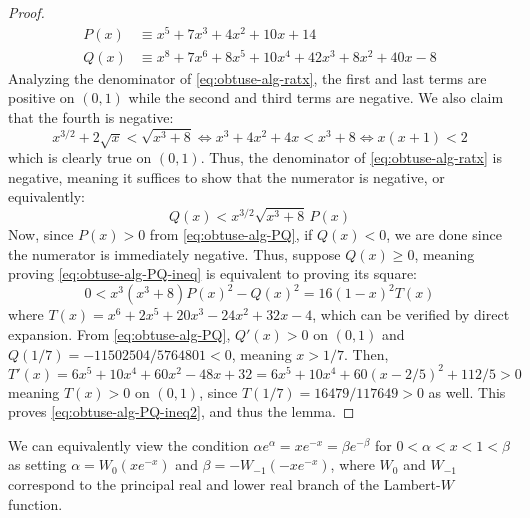 \documentclass[11pt]{article}
\begin{document}
\begin{proof}
\begin{equation}
        \begin{aligned}
        P(x)&\equiv x^5+7x^3+4x^2+10x+14\\
Q(x)&\equiv x^8+7x^6+8x^5+10x^4+42x^3+8x^2+40x-8
        \end{aligned}
    \end{equation}
    Analyzing the denominator of \eqref{eq:obtuse-alg-ratx}, the first and last terms are positive on $(0,1)$ while the second and third terms are negative. We also claim that the fourth is negative: 
    \begin{equation}
        x^{3/2}+2\sqrt x<\sqrt{x^3+8}\Leftrightarrow x^{3}+4x^2+4x<x^3+8\Leftrightarrow x(x+1)<2
    \end{equation}
    which is clearly true on $(0,1)$. Thus, the denominator of \eqref{eq:obtuse-alg-ratx} is negative, meaning it suffices to show that the numerator is negative, or equivalently:
    \begin{equation}\label{eq:obtuse-alg-PQ-ineq}
        Q(x)<x^{3/2}\sqrt{x^3+8}\, P(x)
    \end{equation}
    Now, since $P(x)>0$ from \eqref{eq:obtuse-alg-PQ}, if $Q(x)<0$, we are done since the numerator is immediately negative. Thus, suppose $Q(x)\geq 0$, meaning proving \eqref{eq:obtuse-alg-PQ-ineq} is equivalent to proving its square:
    \begin{equation}\label{eq:obtuse-alg-PQ-ineq2}
        0<x^3(x^3+8)P(x)^2-Q(x)^2=16(1-x)^2T(x)
    \end{equation}
    where $T(x)=x^6+2x^5+20x^3-24x^2+32x-4$, which can be verified by direct expansion. 
    From \eqref{eq:obtuse-alg-PQ}, $Q'(x)>0$ on $(0,1)$ and $Q(1/7)=-11502504/5764801<0$, meaning $x>1/7$. Then, 
    \begin{equation}
        T'(x)=6x^5+10x^4+60x^2-48x+32=6x^5+10x^4+60(x-2/5)^2+112/5>0
    \end{equation}
    meaning $T(x)>0$ on $(0,1)$, since $T(1/7)=16479/117649>0$ as well. This proves \eqref{eq:obtuse-alg-PQ-ineq2}, and thus the lemma.
\end{proof}
We can equivalently view the condition $\alpha e^\alpha=xe^{-x}=\beta e^{-\beta}$ for $0<\alpha<x<1<\beta$ as setting $\alpha=W_0(xe^{-x})$ and $\beta=-W_{-1}(-xe^{-x})$, where $W_0$ and $W_{-1}$ correspond to the principal real and lower real branch of the Lambert-$W$ function.
\end{document}
